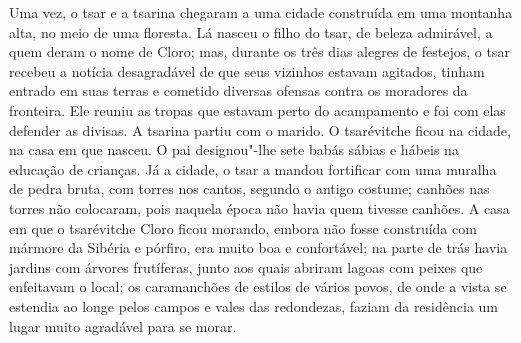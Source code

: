 Uma vez, o tsar e a tsarina chegaram a uma cidade construída em uma
montanha alta, no meio de uma floresta. Lá nasceu o filho do tsar, de
beleza admirável, a quem deram o nome de Cloro; mas, durante os três
dias alegres de festejos, o tsar recebeu a notícia desagradável de que
seus vizinhos estavam agitados, tinham entrado em suas terras e cometido
diversas ofensas contra os moradores da fronteira. Ele reuniu as tropas
que estavam perto do acampamento e foi com elas defender as divisas. A
tsarina partiu com o marido. O tsarévitche ficou na cidade, na casa em
que nasceu. O pai designou"-lhe sete babás sábias e hábeis na educação de
crianças. Já a cidade, o tsar a mandou fortificar com uma muralha de
pedra bruta, com torres nos cantos, segundo o antigo costume; canhões
nas torres não colocaram, pois naquela época não havia quem tivesse
canhões. A casa em que o tsarévitche Cloro ficou morando, embora não
fosse construída com mármore da Sibéria e pórfiro, era muito boa e
confortável; na parte de trás havia jardins com árvores frutíferas,
junto aos quais abriram lagoas com peixes que enfeitavam o local; os
caramanchões de estilos de vários povos, de onde a vista se estendia ao
longe pelos campos e vales das redondezas, faziam da residência um lugar
muito agradável para se morar.

